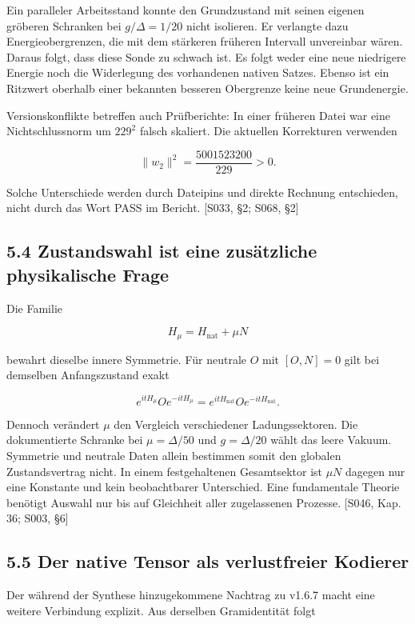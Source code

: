 Ein paralleler Arbeitsstand konnte den Grundzustand mit seinen eigenen
gröberen Schranken bei \(g/\Delta=1/20\) nicht isolieren. Er verlangte
dazu Energieobergrenzen, die mit dem stärkeren früheren Intervall
unvereinbar wären. Daraus folgt, dass diese Sonde zu schwach ist. Es
folgt weder eine neue niedrigere Energie noch die Widerlegung des
vorhandenen nativen Satzes. Ebenso ist ein Ritzwert oberhalb einer
bekannten besseren Obergrenze keine neue Grundenergie.

Versionskonflikte betreffen auch Prüfberichte: In einer früheren Datei
war eine Nichtschlussnorm um \(229^2\) falsch skaliert. Die aktuellen
Korrekturen verwenden

\[\|w_2\|^2=\frac{5001523200}{229}>0.\]

Solche Unterschiede werden durch Dateipins und direkte Rechnung
entschieden, nicht durch das Wort PASS im Bericht. {[}S033, §2; S068,
§2{]}

\subsection{5.4 Zustandswahl ist eine zusätzliche physikalische
Frage}\label{zustandswahl-ist-eine-zusuxe4tzliche-physikalische-frage}

Die Familie

\[H_\mu=H_{\mathrm{nat}}+\mu N\]

bewahrt dieselbe innere Symmetrie. Für neutrale \(O\) mit \([O,N]=0\)
gilt bei demselben Anfangszustand exakt

\[e^{itH_\mu}Oe^{-itH_\mu}=e^{itH_{\mathrm{nat}}}Oe^{-itH_{\mathrm{nat}}}.\]

Dennoch verändert \(\mu\) den Vergleich verschiedener Ladungssektoren.
Die dokumentierte Schranke bei \(\mu=\Delta/50\) und \(g=\Delta/20\)
wählt das leere Vakuum. Symmetrie und neutrale Daten allein bestimmen
somit den globalen Zustandsvertrag nicht. In einem festgehaltenen
Gesamtsektor ist \(\mu N\) dagegen nur eine Konstante und kein
beobachtbarer Unterschied. Eine fundamentale Theorie benötigt Auswahl
nur bis auf Gleichheit aller zugelassenen Prozesse. {[}S046, Kap. 36;
S003, §6{]}

\subsection{5.5 Der native Tensor als verlustfreier
Kodierer}\label{der-native-tensor-als-verlustfreier-kodierer}

Der während der Synthese hinzugekommene Nachtrag zu v1.6.7 macht eine
weitere Verbindung explizit. Aus derselben Gramidentität folgt

